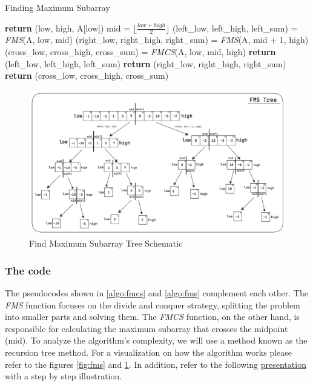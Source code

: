 \documentclass[a4paper,10pt]{article}
\newcommand{\hlti}[1]{\colorbox{color1}{#1}}
\begin{document}
\begin{algorithm}
    \caption{Finding Maximum Subarray}
    \begin{algorithmic}[1]
        \Comment{\hlti{$\Theta(n \log n)$}}
             
                \State \textbf{return} (low, high, A[low])
            \Else
                \State mid = $\lfloor \frac{low + high}{2} \rfloor$
                \State (left\_low, left\_high, left\_sum) = \textit{FMS}(A, low, mid)
                \State (right\_low, right\_high, right\_sum) = \textit{FMS}(A, mid + 1, high)
                \State (cross\_low, cross\_high, cross\_sum) = \textit{FMCS}(A, low, mid, high) 
                    \State \textbf{return} (left\_low, left\_high, left\_sum)
                    \State \textbf{return} (right\_low, right\_high, right\_sum)
                \Else
                    \State \textbf{return} (cross\_low, cross\_high, cross\_sum)
                \EndIf
            \EndIf
        \EndFunction
    \end{algorithmic}
    \label{algo:fms}
\end{algorithm}

\begin{figure}[ht]
\centering
\includegraphics[width=0.7\linewidth]{figures/fms_tree.png}
\caption{Find Maximum Subarray Tree Schematic}
\label{fig:fms_tree}
\end{figure}

\subsubsection{The code}

The pseudocodes shown in \ref{algo:fmcs} and \ref{algo:fms} complement each other. The \textit{FMS} function focuses on the divide and conquer strategy, splitting the problem into smaller parts and solving them. The \textit{FMCS} function, on the other hand, is responsible for calculating the maximum subarray that crosses the midpoint (mid). To analyze the algorithm's complexity, we will use a method known as the recursion tree method. For a visualization on how the algorithm works please refer to the figures \ref{fig:fms} and \ref{fig:fms_tree}. In addition, refer to the following \href{https://docs.google.com/presentation/d/1utq3PvXa1LGvTsO7wlKTSufqmtuGz6Pkf3qJB856QNU/edit?usp=sharing}{presentation} with a step by step illustration. 
\end{document}
